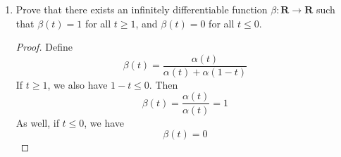 \documentclass{article}
\newcommand{\R}{\mathbf{R}}
\theoremstyle{plain} %
\numberwithin{thm}{section} %
\theoremstyle{definition}
\begin{document}
\begin{enumerate}[label=(\alph*)]
\begin{proof}
\begin{proof}
                By the principle of induction, the lemma holds true for all \(n \in \mathbb{N}\).

            \end{proof}

            We now continue in proving that derivatives of all orders of \(\alpha\) are continuous at 0. We show this by proving that
            \[
                \lim_{t \to 0} \alpha ^{(n)}(t) = 0 \text{, where } n \in \mathbb{N}
            \]
            We will only worry about the right hand limit, as the left hand limit always evaluates to \(0\).

            Let \(n \in \mathbb{N}\). Since we only deal with positive \(t\), by our lemma,
            \[
                \alpha ^{(n)}(t) = Q(t)\alpha (t)
            \]
            Where \(Q(t)\) is a linear combination of nonpositive integer powers of \(t\). So
            \[
                \lim_{t \to 0^+} \alpha ^{(n)}(t) = \lim_{t \to 0^+} Q(t)\alpha (t) = \lim_{t \to 0^+} \sum_{i=0}^k a_i t^{-i} \alpha (t)
            \]
            Where \(a_i\) are real constants and \(k \in \mathbb{N}\).

            Consider an arbitrary term \(a_i t^{-i} \alpha (t) = a_i t^{-i} e^\frac{-1}{t}\). We want to show that \(\lim_{t \to 0^+}a_i t^{-i} e^\frac{-1}{t}\) exists and is equal to 0.

            First, we will perform the substitution \(x = \frac{1}{t}\). Then the limit becomes
            \[
                \lim_{x \to \infty} a_i x^i e^{-x} = 0
            \]
            The proof for this fact is omitted, but applying L'Hopital's rule \(i\) times produces the same result. Thus,
            \[
                \lim_{t \to 0^+} \alpha ^{(n)}(t) = \lim_{t \to 0^+} \sum_{i=0}^k a_i t^{-i} \alpha (t) = \sum_{i=0} ^k \lim_{t \to 0^+} a_i t^{-i} \alpha (t) = \sum_{i=0} ^k 0 = 0
            \]
            Thus \(\alpha \) is infinitely differentiable everywhere.

        \end{proof}

        \item Prove that there exists an infinitely differentiable function $\beta:\R\rightarrow \R$ such that $\beta(t)=1$ for all $t\geq 1$, and $\beta(t)=0$ for all $t\leq 0$.

        \begin{proof}
            Define
            \[
                \beta (t) = \frac{\alpha (t)}{\alpha (t) + \alpha (1-t)}
            \] 
            If \(t\geq 1\), we also have \(1-t \leq 0\). Then
            \[
                \beta (t) = \frac{\alpha (t)}{\alpha (t)} = 1
            \]
            As well, if \(t \leq 0\), we have
            \[
                \beta (t) = 0
            \]


\end{proof}
\end{enumerate}
\end{document}
